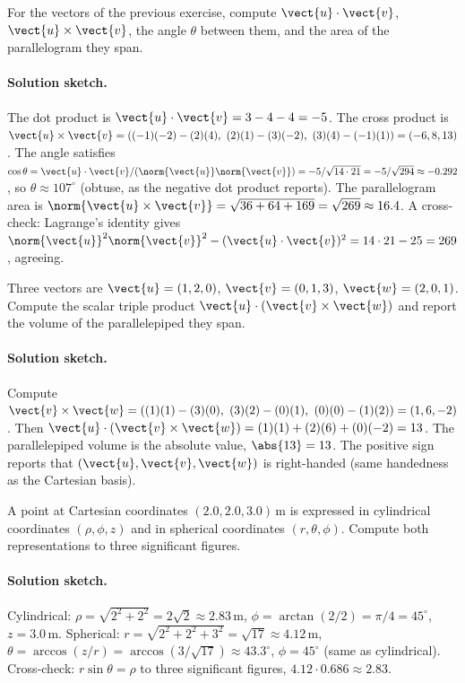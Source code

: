 \begin{exercise}
For the vectors of the previous exercise, compute $\vect{u} \cdot
\vect{v}$, $\vect{u} \times \vect{v}$, the angle $\theta$ between
them, and the area of the parallelogram they span.

\paragraph{Solution sketch.} The dot product is $\vect{u}\cdot
\vect{v} = 3 - 4 - 4 = -5$. The cross product is
$\vect{u}\times\vect{v} = ((-1)(-2) - (2)(4),\ (2)(1) - (3)(-2),\
(3)(4) - (-1)(1)) = (-6, 8, 13)$. The angle satisfies $\cos\theta =
\vect{u}\cdot\vect{v}/(\norm{\vect{u}}\norm{\vect{v}}) =
-5/\sqrt{14\cdot 21} = -5/\sqrt{294} \approx -0.292$, so $\theta
\approx 107^{\circ}$ (obtuse, as the negative dot product reports).
The parallelogram area is $\norm{\vect{u}\times\vect{v}} =
\sqrt{36 + 64 + 169} = \sqrt{269} \approx 16.4$. A cross-check:
Lagrange's identity gives $\norm{\vect{u}}^{2}\norm{\vect{v}}^{2} -
(\vect{u}\cdot\vect{v})^{2} = 14\cdot 21 - 25 = 269$, agreeing.
\end{exercise}

\begin{exercise}
Three vectors are $\vect{u} = (1, 2, 0)$, $\vect{v} = (0, 1, 3)$,
$\vect{w} = (2, 0, 1)$. Compute the scalar triple product
$\vect{u} \cdot (\vect{v} \times \vect{w})$ and report the volume
of the parallelepiped they span.

\paragraph{Solution sketch.} Compute $\vect{v}\times\vect{w} =
((1)(1) - (3)(0),\ (3)(2) - (0)(1),\ (0)(0) - (1)(2)) = (1, 6, -2)$.
Then $\vect{u}\cdot(\vect{v}\times\vect{w}) = (1)(1) + (2)(6) +
(0)(-2) = 13$. The parallelepiped volume is the absolute value,
$\abs{13} = 13$. The positive sign reports that $(\vect{u}, \vect{v},
\vect{w})$ is right-handed (same handedness as the Cartesian basis).
\end{exercise}

\begin{exercise}
A point at Cartesian coordinates $(2.0, 2.0, 3.0) \,\si{\meter}$ is
expressed in cylindrical coordinates $(\rho, \phi, z)$ and in
spherical coordinates $(r, \theta, \phi)$. Compute both
representations to three significant figures.

\paragraph{Solution sketch.} Cylindrical: $\rho = \sqrt{2^{2} + 2^{2}}
= 2\sqrt{2} \approx 2.83\,\si{\meter}$, $\phi = \arctan(2/2) =
\pi/4 = 45^{\circ}$, $z = 3.0\,\si{\meter}$. Spherical: $r =
\sqrt{2^{2} + 2^{2} + 3^{2}} = \sqrt{17} \approx 4.12\,\si{\meter}$,
$\theta = \arccos(z/r) = \arccos(3/\sqrt{17}) \approx 43.3^{\circ}$,
$\phi = 45^{\circ}$ (same as cylindrical). Cross-check: $r\sin\theta
= \rho$ to three significant figures, $4.12\cdot 0.686 \approx 2.83$.
\end{exercise}


